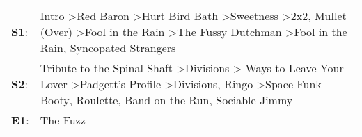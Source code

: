 \begin{supertabular}{p{0.03\textwidth}p{0.92\textwidth}}
 \textbf{S1}:  &  Intro\textsuperscript{} \textgreater \enspace Red Baron\textsuperscript{} \textgreater \enspace Hurt Bird Bath\textsuperscript{} \textgreater \enspace Sweetness\textsuperscript{} \textgreater \enspace 2x2\textsuperscript{}, \enspace Mullet (Over)\textsuperscript{} \textgreater \enspace Fool in the Rain\textsuperscript{} \textgreater \enspace The Fussy Dutchman\textsuperscript{} \textgreater \enspace Fool in the Rain\textsuperscript{}, \enspace Syncopated Strangers\textsuperscript{}  \enspace  \\
 \textbf{S2}:  &  Tribute to the Spinal Shaft\textsuperscript{} \textgreater \enspace Divisions\textsuperscript{} \textgreater {} Ways to Leave Your Lover\textsuperscript{} \textgreater \enspace Padgett's Profile\textsuperscript{} \textgreater \enspace Divisions\textsuperscript{}, \enspace Ringo\textsuperscript{} \textgreater \enspace Space Funk Booty\textsuperscript{}, \enspace Roulette\textsuperscript{}, \enspace Band on the Run\textsuperscript{}, \enspace Sociable Jimmy\textsuperscript{}  \enspace  \\
 \textbf{E1}:  &                                                                                                                                                                                                                                                                                                                                                                                                                                                                              The Fuzz\textsuperscript{}  \enspace  \\
\end{supertabular}
